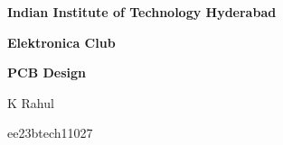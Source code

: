 \begin{titlepage}
\centering
{\bfseries\Huge Indian Institute of Technology Hyderabad\par}


\vfill
\noindent
{\bfseries\Huge Elektronica Club  \par}
\bigskip%
\vspace{0.5cm}

{\bfseries\Large PCB Design\par}
\vspace{0.5cm}
\noindent
\vfill
{\Large K Rahul\par}
{\Large ee23btech11027 \par}
\vfill
\end{titlepage}
\setcounter{page}{0}

